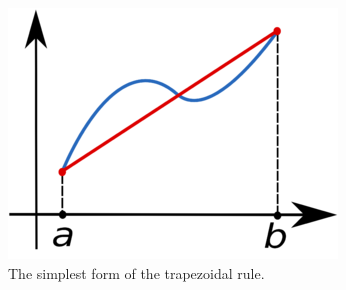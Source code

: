 \documentclass[12pt,a4paper]{article}
\begin{document}
\begin{figure}[h]
	\centering
	\includegraphics[scale=0.7]{trapez1.png}
	\caption{The simplest form of the trapezoidal rule.}
	\label{fig:trapez1.png}
\end{figure}
\end{document}
